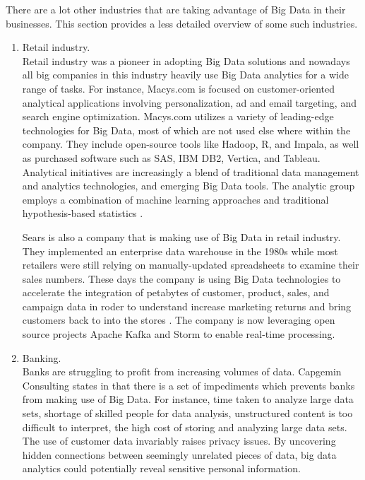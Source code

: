 \documentclass[runningheads]{llncs}
\begin{document}
There are a lot other industries that are taking advantage of Big Data in their businesses. This section provides a less detailed overview of some such industries.

\begin{enumerate}
\item Retail industry.\\

Retail industry was a pioneer in adopting Big Data solutions and nowadays all big companies in this industry heavily use Big Data analytics for a wide range of tasks. For instance, Macys.com is focused on customer-oriented analytical applications involving personalization, ad and email targeting, and search engine optimization. Macys.com utilizes a variety of leading-edge technologies for Big Data, most of which are not used else where within the company. They include open-source tools like Hadoop, R, and Impala, as well as purchased software such as SAS, IBM DB2, Vertica, and Tableau. Analytical initiatives are increasingly a blend of traditional data management and analytics technologies, and emerging Big Data tools. The analytic group employs a combination of machine learning approaches and traditional hypothesis-based statistics \cite{DAVENPORT}.

Sears is also a company that is making use of Big Data in retail industry. They implemented an enterprise data warehouse in the 1980s while most retailers were still relying on manually-updated spreadsheets to examine their sales numbers. These days the company is using Big Data technologies to accelerate the integration of petabytes of customer, product, sales, and campaign data in roder to understand increase marketing returns and bring customers back to into the stores \cite{DAVENPORT}. The company is now leveraging open source projects Apache Kafka and Storm to enable real-time processing.\\

\item Banking.\\

Banks are struggling to profit from increasing volumes of data. Capgemin Consulting states in \cite{} that there is a set of impediments which prevents banks from making use of Big Data. For instance, time taken to analyze large data sets, shortage of skilled people for data analysis, unstructured content is too difficult to interpret, the high cost of storing and analyzing large data sets.  The use of customer data invariably raises privacy issues. By uncovering
hidden connections between seemingly unrelated pieces of data, big data analytics could potentially reveal sensitive
personal information\cite{CAP}. 


\end{enumerate}
\end{document}
